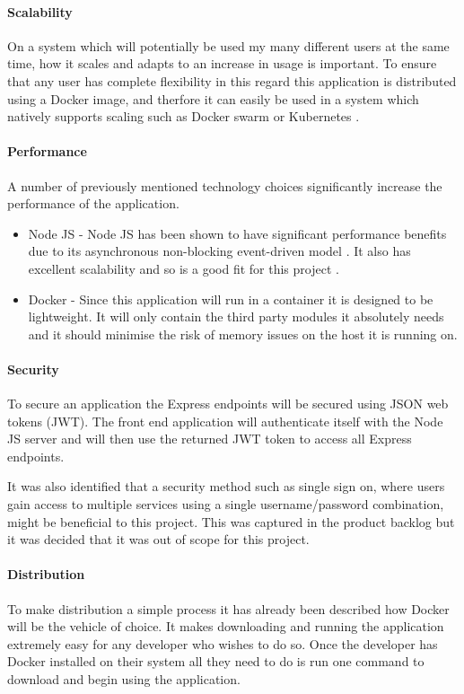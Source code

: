 \paragraph{Scalability}
On a system which will potentially be used my many different users at the same time, how it scales and adapts to an increase in usage is important. To ensure that any user has complete flexibility in this regard this application is distributed using a \gls{Docker image}, and therfore it can easily be used in a system which natively supports scaling such as Docker swarm or Kubernetes \citep{DockerSwarm2017,Kubernetes2017}.

\paragraph{Performance}
A number of previously mentioned technology choices significantly increase the performance of the application. 

\begin{itemize}
	\item Node JS - Node JS has been shown to have significant performance benefits due to its asynchronous non-blocking event-driven model \citep{NodePerformance2010}. It also has excellent scalability and so is a good fit for this project \citep{Griffin2011}.
	\item Docker - Since this application will run in a container it is designed to be lightweight. It will only contain the third party modules it absolutely needs and it should minimise the risk of memory issues on the host it is running on.
\end{itemize}

\paragraph{Security}
To secure an application the Express endpoints will be secured using JSON web tokens (\gls{JWT}). The front end application will authenticate itself with the Node JS server and will then use the returned JWT token to access all Express endpoints. 

It was also identified that a security method such as single sign on, where users gain access to multiple services using a single username/password combination, might be beneficial to this project. This was captured in the product backlog but it was decided that it was out of scope for this project.

\paragraph{Distribution}
To make distribution a simple process it has already been described how \gls{Docker} will be the vehicle of choice. It makes downloading and running the application extremely easy for any developer who wishes to do so. Once the developer has Docker installed on their system all they need to do is run one command to download and begin using the application.
